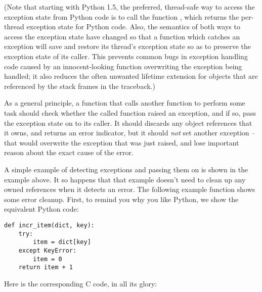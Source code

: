 (Note that starting with Python 1.5, the preferred, thread-safe way to 
access the exception state from Python code is to call the function 
, which returns the per-thread exception state 
for Python code.  Also, the semantics of both ways to access the 
exception state have changed so that a function which catches an 
exception will save and restore its thread's exception state so as to 
preserve the exception state of its caller.  This prevents common bugs 
in exception handling code caused by an innocent-looking function 
overwriting the exception being handled; it also reduces the often 
unwanted lifetime extension for objects that are referenced by the 
stack frames in the traceback.)

As a general principle, a function that calls another function to 
perform some task should check whether the called function raised an 
exception, and if so, pass the exception state on to its caller.  It 
should discards any object references that it owns, and returns an 
error indicator, but it should \emph{not} set another exception -- 
that would overwrite the exception that was just raised, and lose 
important reason about the exact cause of the error.

A simple example of detecting exceptions and passing them on is shown 
in the  example above.  It so happens that that 
example doesn't need to clean up any owned references when it detects 
an error.  The following example function shows some error cleanup.  
First, to remind you why you like Python, we show the equivalent
Python code:

\begin{verbatim}
def incr_item(dict, key):
    try:
        item = dict[key]
    except KeyError:
        item = 0
    return item + 1
\end{verbatim}

Here is the corresponding C code, in all its glory:

